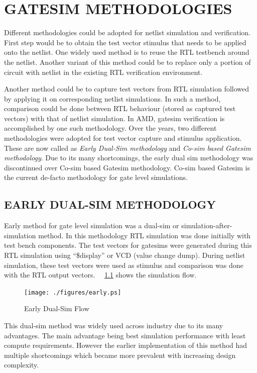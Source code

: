 \chapter{GATESIM METHODOLOGIES}
\label{chap:methodologies.tex}

Different methodologies could be adopted for netlist simulation and verification. First step would be to obtain the test vector stimulus that needs to be applied onto the netlist. One widely used method is to reuse the RTL testbench around the netlist. Another variant of this method could be to replace only a portion of circuit with netlist in the existing RTL verification environment.

Another method could be to capture test vectors from RTL simulation followed by applying it on corresponding netlist simulations. In such a method, comparison could be done between RTL behaviour (stored as captured test vectors) with that of netlist simulation.  In AMD, gatesim verification is accomplished by one such methodology. Over the years, two different methodologies were adopted for test vector capture and stimulus application. These are now called as {\it Early Dual-Sim methodology} and {\it Co-sim based Gatesim methodology}. Due to its many shortcomings, the early dual sim methodology was discontinued over Co-sim based Gatesim methodology. Co-sim based Gatesim is the current de-facto methodology for gate level simulations.


\section{EARLY DUAL-SIM METHODOLOGY}
Early method for gate level simulation was a dual-sim or simulation-after-simulation method. In this methodology RTL simulation was done initially with test bench components. The test vectors for gatesims were generated during this RTL simulation using ``\$display'' or VCD (value change dump). During netlist simulation, these test vectors were used as stimulus and comparison was done with the RTL output vectors. ~\figurename{~\ref{fig:early.ps}} shows the simulation flow. %

\begin{figure}[h]
\centering
\texttt{[image: ./figures/early.ps]}
\caption{Early Dual-Sim Flow}
\label{fig:early.ps}
\end{figure}

This dual-sim method was widely used across industry due to its many advantages. The main advantage being best simulation performance with least compute requirements. However the earlier implementation of this method had multiple shortcomings which became more prevalent with increasing design complexity.

